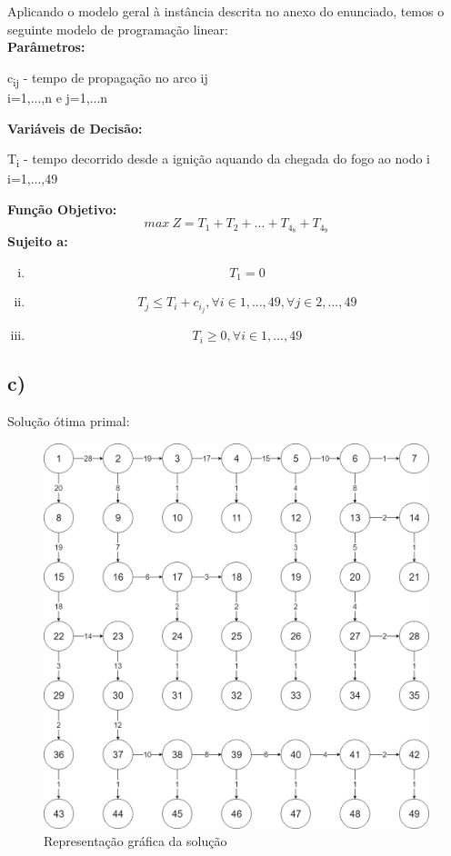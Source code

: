 \documentclass[11pt]{article} %
\begin{document}
Aplicando o modelo geral à instância descrita no anexo do enunciado, temos o seguinte modelo de programação linear: \\
\textbf{Parâmetros:}  \\
\begin{center}
c\textsubscript{ij} - tempo de propagação no arco ij\\
i=1,...,n e j=1,...n \\
\end{center}
\textbf{Variáveis de Decisão:} \\
\begin{center}
T\textsubscript{i} - tempo decorrido desde a ignição aquando da chegada do fogo ao nodo i\\
i=1,...,49\\
\end{center}
\textbf{Função Objetivo:} \\
$$max \ Z = T_1+T_2+...+T_4_8+T_4_9$$
\textbf{Sujeito a:}
\begin{enumerate}[(i)]
\item $$T_1 = 0$$
\item $$T_j \leq T_i + c_i_j, \forall i \in 1,...,49 , \forall j \in 2,...,49$$
\item $$T_i \geq 0, \forall i \in 1,...,49$$
\end{enumerate}


\newpage

\subsection*{c)}
Solução ótima primal:

	\begin{figure}[!htpb]
		\centering
    		\includegraphics[width=5in]{grafo1c.png}
    		\caption{Representação gráfica da solução}
	\end{figure}
\end{document}
